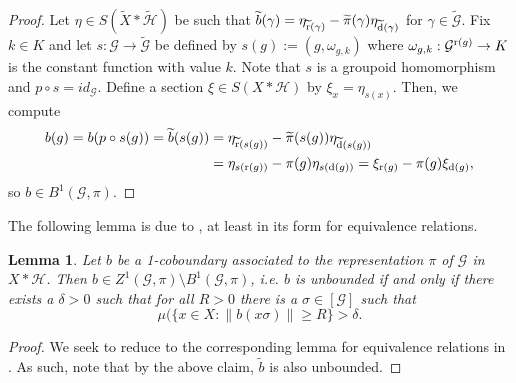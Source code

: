\documentclass[a4paper,11pt]{article}
\numberwithin{equation}{section}
\newtheorem{lem}[thm]{Lemma}
\theoremstyle{definition}
\newtheorem{defn}[thm]{Definition}
\theoremstyle{remark}
\numberwithin{equation}{section}
\newcommand{\rG}{\mathcal{G}}
\def\H{\mathcal H}
\def\R{\mathbb{R}}
\def\r{{\rm r}}
\def\d{{\rm d}}
\providecommand{\norm}[1]{\lVert#1\rVert}
\numberwithin{equation}{section}
\begin{document}
\begin{proof}
    Let $ \eta \in S(\widetilde{X}\ast \widetilde{\H}) $ be such that $ \widetilde{b}(\gamma) = \eta_{\widetilde{\r}(\gamma)}-\widetilde{\pi}(\gamma) \eta_{\widetilde{\d}(\gamma)} $ for $ \gamma\in \widetilde{\rG} $. Fix $ k\in K $ and let $ s:\rG\to \widetilde{\rG} $ be defined by $ s(g):= (g,\omega_{g,k}) $ where $ \omega_{g,k}:\rG^{\r(g)}\to K $ is the constant function with value $ k $. Note that $ s $ is a groupoid homomorphism and $ p\circ s = id_{\rG} $. Define a section $ \xi\in S(X\ast \H) $ by $ \xi_{x} = \eta_{s(x)} $. Then, we compute
    \begin{align*}
        b(g) = b(p\circ s (g)) = \widetilde{b}(s(g)) &= \eta_{\widetilde{\r}(s(g))}-\widetilde{\pi}(s(g)) \eta_{\widetilde{\d}(s(g))} \\
        &=\eta_{s(\r(g))}-\pi(g) \eta_{s(\d(g))} =\xi_{\r(g)} -\pi(g)\xi_{\d(g)},
    \end{align*}
    so $ b\in B^{1}(\rG,\pi) $.
\end{proof}

The following lemma is due to \textcite[Lemmas 2.1, 2.2]{hoff:16}, at least in its form for equivalence relations.

\begin{lem}\label{unbound}      
    Let $b$ be a 1-coboundary associated to the representation $\pi$ of $\rG$ in $X\ast \H$. Then $ b \in Z^{1}(\rG,\pi)\setminus B^{1}(\rG,\pi) $, i.e. $ b $ is \textit{unbounded} if and only if there exists a $ \delta >0 $ such that for all $ R>0 $ there is a $ \sigma\in [\rG] $ such that 
    \[
        \mu(\{x\in X: \norm{b(x\sigma)} \geq R\} > \delta.
    \]
\end{lem}

\begin{proof}
    We seek to reduce to the corresponding lemma for equivalence relations in \cite[Lemma 2.2]{hoff:16}. As such, note that by the above claim, $\widetilde{b}$ is also unbounded.
\end{proof}







\end{document}
